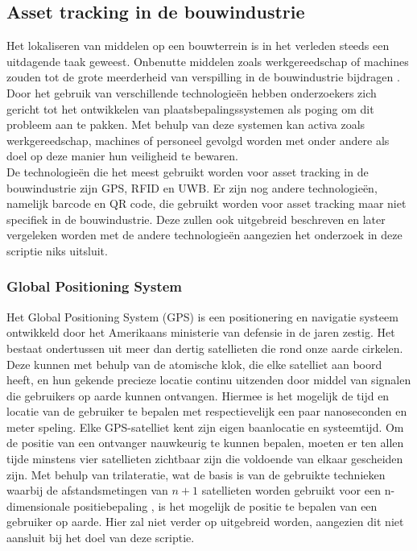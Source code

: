 \subsection{Asset tracking in de bouwindustrie}

Het lokaliseren van middelen op een bouwterrein is in het verleden steeds een uitdagende taak geweest. Onbenutte middelen zoals werkgereedschap of machines zouden tot de grote meerderheid van verspilling in de bouwindustrie bijdragen \autocite{Nasr2013}. Door het gebruik van verschillende technologieën hebben onderzoekers zich gericht tot het ontwikkelen van plaatsbepalingssystemen als poging om dit probleem aan te pakken. Met behulp van deze systemen kan activa zoals werkgereedschap, machines of personeel gevolgd worden met onder andere als doel op deze manier hun veiligheid te bewaren.\\

De technologieën die het meest gebruikt worden voor asset tracking in de bouwindustrie zijn GPS, RFID en UWB. Er zijn nog andere technologieën, namelijk barcode en QR code, die gebruikt worden voor asset tracking maar niet specifiek in de bouwindustrie. Deze zullen ook uitgebreid beschreven en later vergeleken worden met de andere technologieën aangezien het onderzoek in deze scriptie niks uitsluit.

\subsubsection{Global Positioning System}

Het Global Positioning System (GPS) is een positionering en navigatie systeem ontwikkeld door het Amerikaans ministerie van defensie \autocite{McNeff} in de jaren zestig. Het bestaat ondertussen uit meer dan dertig satellieten die rond onze aarde cirkelen. Deze kunnen met behulp van de atomische klok, die elke satelliet aan boord heeft, en hun gekende precieze locatie continu uitzenden door middel van signalen die gebruikers op aarde kunnen ontvangen. Hiermee is het mogelijk de tijd en locatie van de gebruiker te bepalen met respectievelijk een paar nanoseconden en meter speling. Elke GPS-satelliet kent zijn eigen baanlocatie en systeemtijd. Om de positie van een ontvanger nauwkeurig te kunnen bepalen, moeten er ten allen tijde minstens vier satellieten zichtbaar zijn die voldoende van elkaar gescheiden zijn. Met behulp van trilateratie, wat de basis is van de gebruikte technieken waarbij de afstandsmetingen van \(n + 1\) satellieten worden gebruikt voor een n-dimensionale positiebepaling \autocite{Rahman2012}, is het mogelijk de positie te bepalen van een gebruiker op aarde. Hier zal niet verder op uitgebreid worden, aangezien dit niet aansluit bij het doel van deze scriptie.\\

